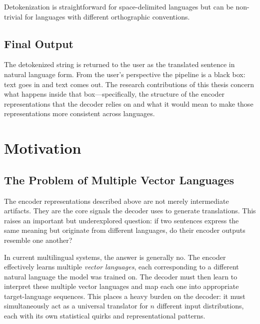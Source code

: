 \noindent Detokenization is straightforward for space-delimited languages but can be non-trivial for languages with different orthographic conventions.

\subsection{Final Output}

The detokenized string is returned to the user as the translated sentence in natural language form. From the user's perspective the pipeline is a black box: text goes in and text comes out. The research contributions of this thesis concern what happens inside that box---specifically, the structure of the encoder representations that the decoder relies on and what it would mean to make those representations more consistent across languages.

\section{Motivation}

\subsection{The Problem of Multiple Vector Languages}

The encoder representations described above are not merely intermediate artifacts. They are the core signals the decoder uses to generate translations. This raises an important but underexplored question: if two sentences express the same meaning but originate from different languages, do their encoder outputs resemble one another?

In current multilingual systems, the answer is generally no. The encoder effectively learns multiple \emph{vector languages}, each corresponding to a different natural language the model was trained on. The decoder must then learn to interpret these multiple vector languages and map each one into appropriate target-language sequences. This places a heavy burden on the decoder: it must simultaneously act as a universal translator for $n$ different input distributions, each with its own statistical quirks and representational patterns.

